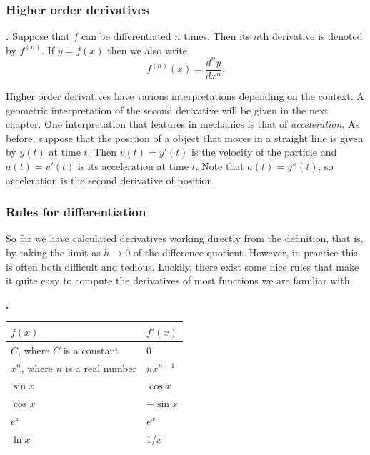 \documentclass[t]{beamer}
\theoremstyle{plain}
\theoremstyle{definition}
\newcounter{heading}
\newcommand{\newhead}[1]{\medskip\stepcounter{heading}\noindent\textbf{\hspace{0.2cm}{#1}.}}
\begin{document}
\begin{frame}
\frametitle{Higher order derivatives}


\newhead{Notation} Suppose that $f$ can be differentiated $n$ times. Then its $n$th derivative is denoted by $f^{(n)}$. If $y=f(x)$ then we also write
\[f^{(n)}(x)=\frac{d^ny}{dx^n}.\]\pause

\noindent Higher order derivatives have various interpretations depending on the context. A geometric interpretation of the second derivative will be given in the next chapter. One interpretation that features in mechanics is that of \emph{acceleration}. As before, suppose that the position of a object that moves in a straight line is given by $y(t)$ at time $t$.  Then $v(t) = y'(t)$ is the velocity of the particle and $a(t) = v'(t)$ is its acceleration at time $t$.  Note that $a(t) = y''(t)$, so acceleration is the second derivative of position.
\end{frame}

\begin{frame}
\frametitle{Rules for differentiation}

\noindent So far we have calculated derivatives working directly from the definition, that is, by taking the limit as $h \to 0$ of the difference quotient. However, in practice this is often both difficult and tedious.  Luckily, there exist some nice rules that make it quite easy to compute the derivatives of most functions we are familiar with.

\newhead{Some basic derivatives}
\begin{center}
\begin{tabular}{|l|l|}
\hline
$f(x)$					& $f'(x)$			\\
\hline
$C$, where $C$ is a constant		& $0$				\\
$x^n$, where $n$ is a real number	& $nx^{n-1}$			\\
$\sin x$				& $\cos x$			\\
$\cos x$				& $-\sin x$		\\
$e^x$				& $e^x$ \\
$\ln x$				& $1/x$\\
\hline
\end{tabular}
\end{center}
\end{frame}
\end{document}
